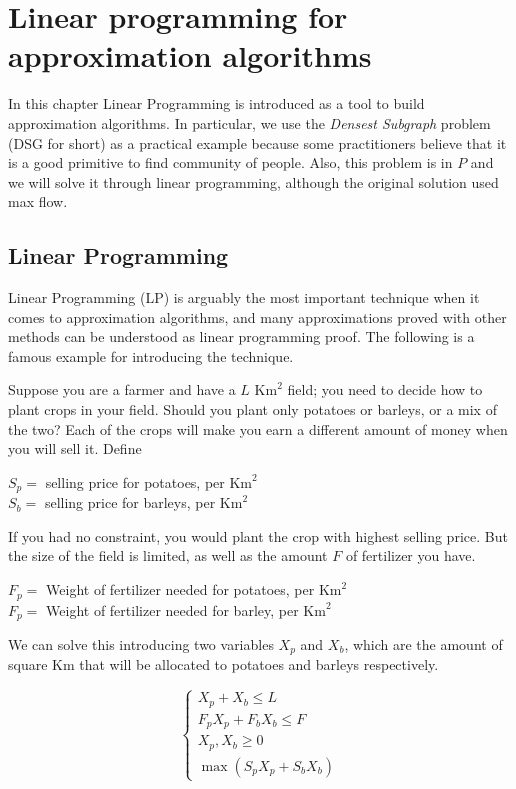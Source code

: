 
\chapter{Linear programming for approximation algorithms}

 In this chapter Linear Programming is introduced as a tool to build approximation algorithms. In particular, we use the \emph{Densest Subgraph} problem (DSG for short) as a practical example because some practitioners believe that it is a good primitive to find community of people. Also, this problem is in $P$ and we will solve it through linear programming, although the original solution used max flow.

\section{Linear Programming}

Linear Programming (LP) is arguably the most important technique when it comes to approximation algorithms, and many approximations proved with other methods can be understood as linear programming proof. The following is a famous example for introducing the technique.

Suppose you are a farmer and have a $L$ $\text{Km}^2$ field; you need to decide how to plant crops in your field. Should you plant only potatoes or barleys, or a mix of the two? Each of the crops will make you earn a different amount of money when you will sell it. Define

\begin{center}
$S_p = $ selling price for potatoes, per $\text{Km}^2$\\
$S_b = $ selling price for barleys, per $\text{Km}^2$\\
\end{center}

If you had no constraint, you would plant the crop with highest selling price. But the size of the field is limited, as well as the amount $F$ of fertilizer you have.
\begin{center}
$F_p = $ Weight of fertilizer needed for potatoes, per $\text{Km}^2$\\
$F_p = $ Weight of fertilizer needed for barley, per $\text{Km}^2$
\end{center}

We can solve this introducing two variables $X_p$ and $X_b$, which are the amount of square Km that will be allocated to potatoes and barleys respectively.

\begin{equation}
\begin{cases}
X_p + X_b \leq L\\
F_pX_p + F_bX_b \leq F\\
X_p, X_b \geq 0\\
\max (S_pX_p + S_bX_b)
\end{cases}
\end{equation}

